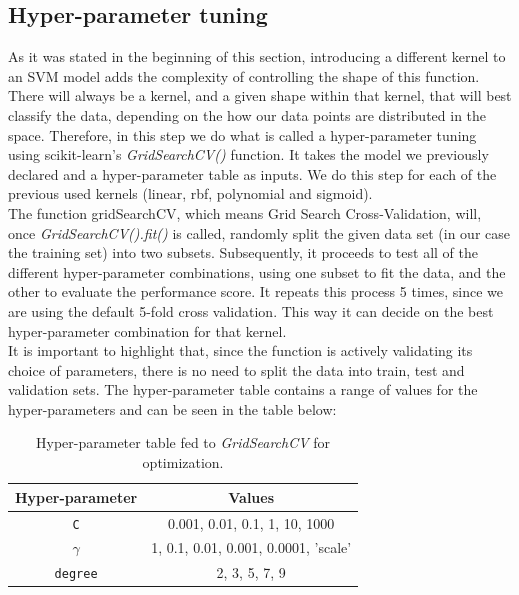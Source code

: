 \documentclass{thesisreport}
\begin{document}
\subsection{Hyper-parameter tuning}
As it was stated in the beginning of this section, introducing a different kernel to an SVM model adds the complexity of controlling the shape of this function. There will always be a kernel, and a given shape within that kernel, that will best classify the data, depending on the how our data points are distributed in the space. Therefore, in this step we do what is called a hyper-parameter tuning using scikit-learn's \textit{GridSearchCV()} function. It takes the model we previously declared and a hyper-parameter table as inputs. We do this step for each of the previous used kernels (linear, rbf, polynomial and sigmoid).\\
The function gridSearchCV, which means Grid Search Cross-Validation, will, once \textit{GridSearchCV().fit()} is called, randomly split the given data set (in our case the training set) into two subsets. Subsequently, it proceeds to test all of the different hyper-parameter combinations, using one subset to fit the data, and the other to evaluate the performance score. It repeats this process 5 times, since we are using the default 5-fold cross validation. This way it can decide on the best hyper-parameter combination for that kernel.\\
It is important to highlight that, since the function is actively validating its choice of parameters, there is no need to split the data into train, test and validation sets.
The hyper-parameter table contains a range of values for the hyper-parameters and can be seen in the table below:
\begin{table}[H]
\centering
\begin{tabular}{|c|c|}
\hline
    \textbf{Hyper-parameter} & \textbf{Values}\\
\hline
    \texttt{C} & 0.001, 0.01, 0.1, 1, 10, 1000 \\
    \texttt{$\gamma$} & 1, 0.1, 0.01, 0.001, 0.0001, 'scale' \\
    \texttt{degree} & 2, 3, 5, 7, 9 \\
\hline
\end{tabular}
\caption{Hyper-parameter table fed to \textit{GridSearchCV} for optimization.}
\label{tab:svm-hyperparameters}
\end{table}
\end{document}
